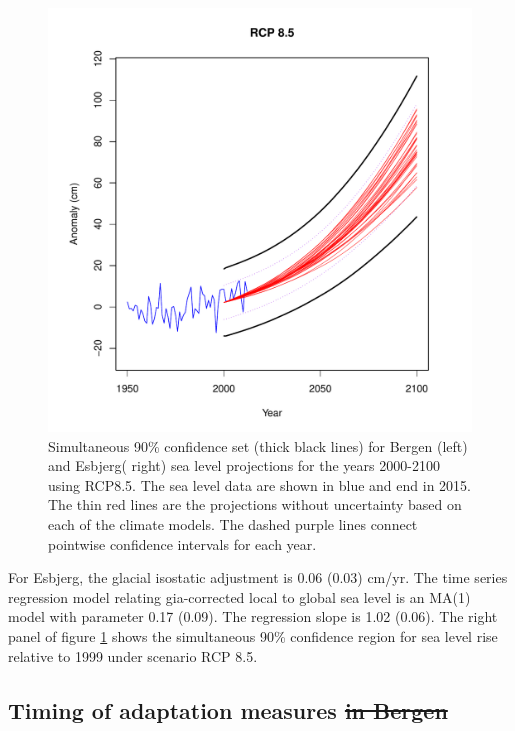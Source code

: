 \documentclass[draft,linenumbers]{agujournal}
\providecommand{\DIFadd}[1]{{\protect\color{blue}\uwave{#1}}} %
\providecommand{\DIFdel}[1]{{\protect\color{red}\sout{#1}}}                      %
\providecommand{\DIFaddbegin}{} %
\providecommand{\DIFaddend}{} %
\providecommand{\DIFdelbegin}{} %
\providecommand{\DIFdelend}{} %
\begin{document}
\begin{figure}[!hbpt]
\begin{center}
\begin{minipage}{.5\textwidth}
    \includegraphics[width=\linewidth]{esbjerg_ci.pdf}

\end{minipage}
\caption{Simultaneous 90\% confidence set (thick black lines) for Bergen (left) and Esbjerg( right) sea level projections for the years 2000-2100 using RCP8.5. The sea level data are shown in blue and end in 2015. The thin red lines are the projections without uncertainty based on each of the climate models. The dashed purple lines connect pointwise confidence intervals for each year. }
\label{fig:ci}
\end{center}
\end{figure}

For Esbjerg, the glacial isostatic adjustment is 0.06 (0.03) cm/yr. The time series regression model relating gia-corrected local to global sea level is an MA(1) model with parameter 0.17 (0.09). The regression slope is 1.02 (0.06). The right panel of figure \ref{fig:ci} shows the simultaneous 90\% confidence region for sea level rise relative to 1999 under scenario RCP 8.5.


\subsection{Timing of adaptation measures \DIFdelbegin \DIFdel{in Bergen}\DIFdelend \DIFaddbegin {\color{blue} \DIFadd{(KdB, TT)}}\DIFaddend }
\end{document}
